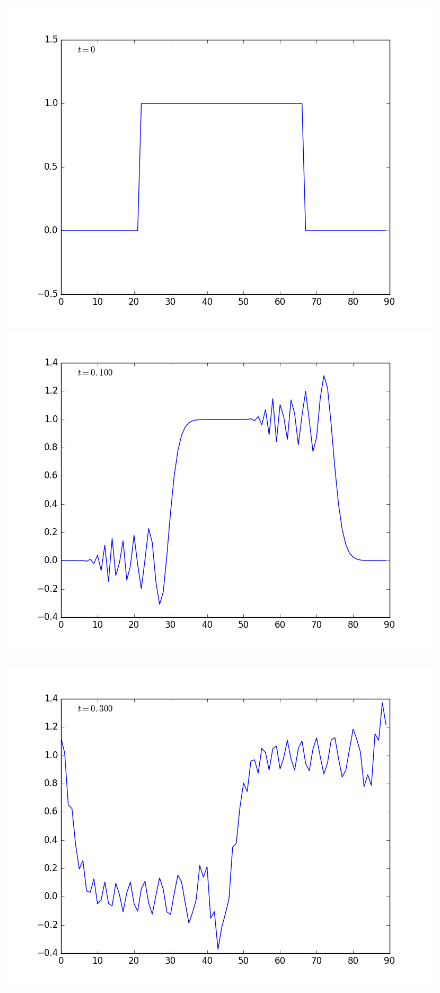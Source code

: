 \documentclass[12pt]{article}
\begin{document}
\begin{enumerate}[(a)]
\noindent\begin{figure}[H]
\includegraphics[scale=0.45]{CN_advection_frames/CN_advection_fig01.png}
\includegraphics[scale=0.45]{CN_advection_frames/CN_advection_fig03.png}
\end{figure} 
\begin{figure}[H]
\includegraphics[scale=0.45]{CN_advection_frames/CN_advection_fig05.png}

\end{figure}
\end{enumerate}
\end{document}
